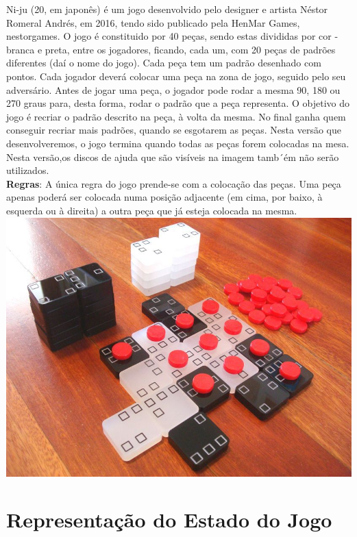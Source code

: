 \documentclass[a4paper]{article}
\begin{document}
Ni-ju (20, em japonês) é um jogo desenvolvido pelo designer e artista Néstor Romeral Andrés, em 2016, tendo sido publicado pela HenMar Games, nestorgames.
O jogo é constituido por 40 peças, sendo estas divididas por cor - branca e preta, entre os jogadores, ficando, cada um, com 20 peças de padrões diferentes (daí o nome do jogo). Cada peça tem um padrão desenhado com pontos.
Cada jogador deverá colocar uma peça na zona de jogo, seguido pelo seu adversário.
Antes de jogar uma peça, o jogador pode rodar a mesma 90, 180 ou 270 graus para, desta forma, rodar o padrão que a peça representa.
O objetivo do jogo é recriar o padrão descrito na peça, à volta da mesma. No final ganha quem conseguir recriar mais padrões, quando se esgotarem as peças.
Nesta versão que desenvolveremos, o jogo termina quando todas as peças forem colocadas na mesa. Nesta versão,os discos de ajuda que são visíveis na imagem tamb´ém não serão utilizados.
\linebreak\linebreak\\
\textbf{Regras}:
  A única regra do jogo prende-se com a colocação das peças. Uma peça apenas poderá ser colocada numa posição adjacente (em cima, por baixo, à esquerda ou à direita) a outra peça que já esteja colocada na mesma.
\linebreak\linebreak\\

\includegraphics[scale=0.3]{../printscreens/niju.jpg} \linebreak


\section{Representação do Estado do Jogo}
\end{document}
